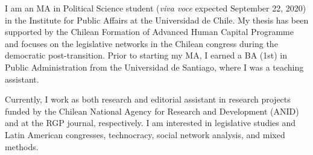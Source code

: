 




\par{I am an MA in Political Science student ({\itshape viva voce} expected September 22, 2020) in the Institute for Public Affairs at the Universidad de Chile. My thesis has been supported by the Chilean Formation of Advanced Human Capital Programme and focuses on the legislative networks in the Chilean congress during the democratic post-transition. Prior to starting my MA, I earned a BA (1st) in Public Administration from the Universidad de Santiago, where I was a teaching assistant.

Currently, I work as both research and editorial assistant in research projects funded by the Chilean National Agency for Research and Development (ANID) and at the RGP journal, respectively. I am interested in legislative studies and Latin American congresses, technocracy, social network analysis, and mixed methods.}\\